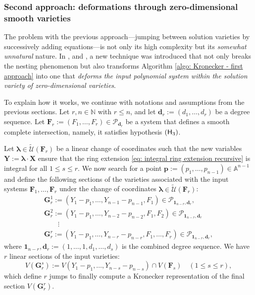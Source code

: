 \documentclass[pdflatex,sn-basic]{sn-jnl}%
\theoremstyle{thmstyleone}%
\theoremstyle{thmstyletwo}%
\theoremstyle{thmstylethree}%
\theoremstyle{definition}
\numberwithin{equation}{section}
\newcommand{\bfs}{\boldsymbol}
\newcommand{\N}{\mathbb N}
\newcommand{\A}{\mathbb A}
\begin{document}
\subsubsection{Second approach: deformations through zero-dimensional
smooth varieties}
\label{subsec: second approach}
%
The problem with the previous approach---jumping between solution
varieties by successively adding equations---is not only its high
complexity but its {\em somewhat unnatural} nature. In
\cite{GiHaHeMoMoPa97}, \cite{GiHeMoMoPa98} and \cite{GiHeMoPa97}, a
new technique was introduced that not only breaks the nesting
phenomenon but also transforms Algorithm \ref{algo: Kronecker -
first approach} into one that {\em deforms the input polynomial
system within the solution variety of zero-dimensional varieties}.

To explain how it works, we continue with notations and assumptions
from the previous sections. Let $r,n\in\N$ with $r\le n$, and let
$\bfs d_r:=(d_1,\ldots,d_r)$ be a degree sequence. Let $\bfs
F_r:=(F_1,\ldots,F_r)\in \mathcal{P}_{\bfs d_r}$ be a system that
defines a smooth complete intersection, namely, it satisfies
hypothesis $({\sf H}_3)$.

Let $\bfs\lambda\in\mathcal{\widetilde{U}}(\bfs F_r)$ be a linear
change of coordinates such that the new variables $\bfs
Y:=\bfs\lambda\cdot \bfs X$ ensure that the ring extension
\eqref{eq: integral ring extension recursive} is integral for all
$1\le s\le r$. We now search for a point $\bfs
p:=(p_1,\ldots,p_{n-1})\in\A^{n-1}$ and define the following
sections of the varieties associated with the input systems $\bfs
F_1,\ldots,\bfs F_r$ under the change of coordinates
$\bfs\lambda\in\mathcal{\widetilde{U}}(\bfs F_r)$:
%
\begin{equation}\label{eq: linear sections}
\begin{array}{l}
\bfs G_r^1:=(Y_1-p_1,\ldots,Y_{n-1}-p_{n-1},F_1)\in\mathcal{P}_{\bfs 1_{n-r},\bfs d_r}, \\[1ex]
\bfs G_r^2:=(Y_1-p_1,\ldots,Y_{n-2}-p_{n-2},F_1,F_2)\in\mathcal{P}_{\bfs 1_{n-r},\bfs d_r} \\
 \qquad \vdots \\
\bfs
G_r^r:=(Y_1-p_1,\ldots,Y_{n-r}-p_{n-r},F_1,\ldots,F_r)\in\mathcal{P}_{\bfs
1_{n-r},\bfs d_r},
\end{array}
\end{equation}
%
where ${\bfs 1_{n-r},\bfs d_r}:=(1,\ldots,1,d_1,\ldots,d_s)$ is the
combined degree sequence. We have $r$ linear sections of the input
varieties:
%
$$V(\bfs G_r^s):=V(Y_1-p_1,\ldots,Y_{n-s}-p_{n-s})\cap V(\bfs F_s)\quad (1\le s\le r),$$
%
which define $r$ jumps to finally compute a Kronecker representation of
the final section $V(\bfs G_r^r)$.
\end{document}
